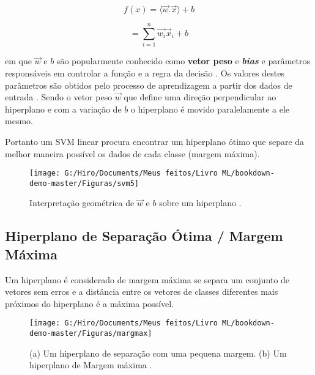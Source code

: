 \documentclass[
  openany]{book}
\begin{document}
\begin{equation}
f(x)= \langle\vec{w}.\vec{x}\rangle+b
\label{eq:classlin}
\end{equation}

\begin{equation}
= \displaystyle \sum^n_{i=1} \vec{w_i} \vec{x}_i+b
\label{eq:classlin2}
\end{equation}

em que \(\vec{w}\) e \(b\) são popularmente conhecido como \textbf{vetor peso} e \textbf{\emph{bias}} e parâmetros responsáveis em controlar a função e a regra da decisão \citep{lima2002maquinas}. Os valores destes parâmetros são obtidos pelo processo de aprendizagem a partir dos dados de entrada \citep{gonccalves2015maquina}. Sendo o vetor peso \(\vec{w}\) que define uma direção perpendicular ao hiperplano e com a variação de \(b\) o hiperplano é movido paralelamente a ele mesmo.

Portanto um SVM linear procura encontrar um hiperplano ótimo que separe da melhor maneira possível os dados de cada classe (margem máxima).

\begin{figure}

{\centering \texttt{[image: G:/Hiro/Documents/Meus feitos/Livro ML/bookdown-demo-master/Figuras/svm5]} 

}

\caption{Interpretação geométrica de \(\vec{w}\) e \(b\) sobre um hiperplano \citep{lima2002maquinas, gonccalves2015maquina}.}\label{fig:svm5}
\end{figure}



\hypertarget{margmax}{%
\subsection{Hiperplano de Separação Ótima / Margem Máxima}\label{margmax}}

Um hiperplano é considerado de margem máxima se separa um conjunto de vetores sem erros e a distância entre os vetores de classes diferentes mais próximos do hiperplano é a máxima possível.

\begin{figure}

{\centering \texttt{[image: G:/Hiro/Documents/Meus feitos/Livro ML/bookdown-demo-master/Figuras/margmax]} 

}

\caption{(a) Um hiperplano de separação com uma pequena margem. (b) Um hiperplano de Margem máxima \citep{da2009classificaccao}.}\label{fig:margmax}
\end{figure}
\end{document}
